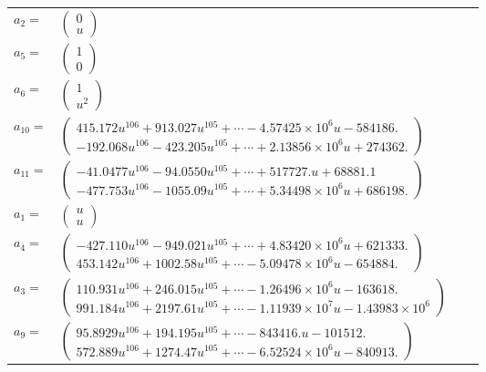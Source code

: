 \documentclass[1p]{elsarticle_modified}
\theoremstyle{definition}
\begin{document}
\begin{tabular}{m{7pt} m{180pt} m{7pt} m{180pt} }
\flushright $a_{2}=$&$\begin{pmatrix}0\\u\end{pmatrix}$ \\
\flushright $a_{5}=$&$\begin{pmatrix}1\\0\end{pmatrix}$ \\
\flushright $a_{6}=$&$\begin{pmatrix}1\\u^2\end{pmatrix}$ \\
\flushright $a_{10}=$&$\begin{pmatrix}415.172 u^{106}+913.027 u^{105}+\cdots-4.57425\times10^{6} u-584186.\\-192.068 u^{106}-423.205 u^{105}+\cdots+2.13856\times10^{6} u+274362.\end{pmatrix}$ \\
\flushright $a_{11}=$&$\begin{pmatrix}-41.0477 u^{106}-94.0550 u^{105}+\cdots+517727. u+68881.1\\-477.753 u^{106}-1055.09 u^{105}+\cdots+5.34498\times10^{6} u+686198.\end{pmatrix}$ \\
\flushright $a_{1}=$&$\begin{pmatrix}u\\u\end{pmatrix}$ \\
\flushright $a_{4}=$&$\begin{pmatrix}-427.110 u^{106}-949.021 u^{105}+\cdots+4.83420\times10^{6} u+621333.\\453.142 u^{106}+1002.58 u^{105}+\cdots-5.09478\times10^{6} u-654884.\end{pmatrix}$ \\
\flushright $a_{3}=$&$\begin{pmatrix}110.931 u^{106}+246.015 u^{105}+\cdots-1.26496\times10^{6} u-163618.\\991.184 u^{106}+2197.61 u^{105}+\cdots-1.11939\times10^{7} u-1.43983\times10^{6}\end{pmatrix}$ \\
\flushright $a_{9}=$&$\begin{pmatrix}95.8929 u^{106}+194.195 u^{105}+\cdots-843416. u-101512.\\572.889 u^{106}+1274.47 u^{105}+\cdots-6.52524\times10^{6} u-840913.\end{pmatrix}$ \\

\end{tabular}
\end{document}
